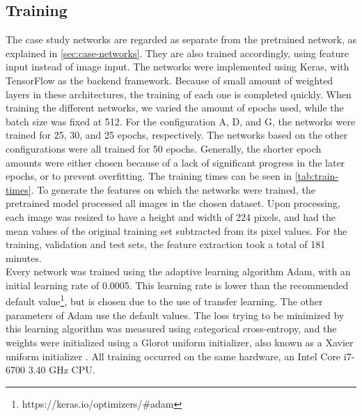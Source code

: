 \subsection{Training} \label{sec:case-training}

The case study networks are regarded as separate from the pretrained network, as explained in \autoref{sec:case-networks}. They are also trained accordingly, using feature input instead of image input. The networks were implemented using Keras, with TensorFlow as the backend framework. Because of small amount of weighted layers in these architectures, the training of each one is completed quickly. When training the different networks, we varied the amount of epochs used, while the batch size was fixed at 512. For the configuration A, D, and G, the networks were trained for 25, 30, and 25 epochs, respectively. The networks based on the other configurations were all trained for 50 epochs. Generally, the shorter epoch amounts were either chosen because of a lack of significant progress in the later epochs, or to prevent overfitting. The training times can be seen in \autoref{tab:train-times}. To generate the features on which the networks were trained, the pretrained model processed all images in the chosen dataset. Upon processing, each image was resized to have a height and width of 224 pixels, and had the mean values of the original training set subtracted from its pixel values. For the training, validation and test sets, the feature extraction took a total of 181 minutes. \\

\noindent Every network was trained using the adaptive learning algorithm Adam, with an initial learning rate of 0.0005. This learning rate is lower than the recommended default value\footnote{https://keras.io/optimizers/\#adam}, but is chosen due to the use of transfer learning. The other parameters of Adam use the default values. The loss trying to be minimized by this learning algorithm was measured using categorical cross-entropy, and the weights were initialized using a Glorot uniform initializer, also known as a Xavier uniform initializer \cite{glorot}. All training occurred on the same hardware, an Intel\textregistered{} Core\texttrademark{} i7-6700 3.40 GHz CPU. 


